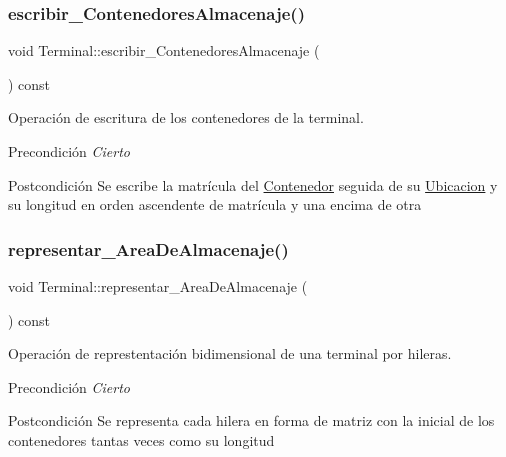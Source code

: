 \subsubsection{\texorpdfstring{escribir\+\_\+\+Contenedores\+Almacenaje()}{escribir\_ContenedoresAlmacenaje()}}
{\footnotesize\ttfamily void Terminal\+::escribir\+\_\+\+Contenedores\+Almacenaje (\begin{DoxyParamCaption}{ }\end{DoxyParamCaption}) const}



Operación de escritura de los contenedores de la terminal. 

\begin{DoxyPrecond}{Precondición}
{\itshape Cierto} 
\end{DoxyPrecond}
\begin{DoxyPostcond}{Postcondición}
Se escribe la matrícula del \hyperlink{class_contenedor}{Contenedor} seguida de su \hyperlink{class_ubicacion}{Ubicacion} y su longitud en orden ascendente de matrícula y una encima de otra 
\end{DoxyPostcond}
\mbox{\label{class_terminal_a32d375e8cecdafbbf0a291f646456dd6}} 
\subsubsection{\texorpdfstring{representar\+\_\+\+Area\+De\+Almacenaje()}{representar\_AreaDeAlmacenaje()}}
{\footnotesize\ttfamily void Terminal\+::representar\+\_\+\+Area\+De\+Almacenaje (\begin{DoxyParamCaption}{ }\end{DoxyParamCaption}) const}



Operación de represtentación bidimensional de una terminal por hileras. 

\begin{DoxyPrecond}{Precondición}
{\itshape Cierto} 
\end{DoxyPrecond}
\begin{DoxyPostcond}{Postcondición}
Se representa cada hilera en forma de matriz con la inicial de los contenedores tantas veces como su longitud 
\end{DoxyPostcond}
\mbox{\label{class_terminal_afbfd7c045961e20718f9b5ffa1a31aa1}} 
